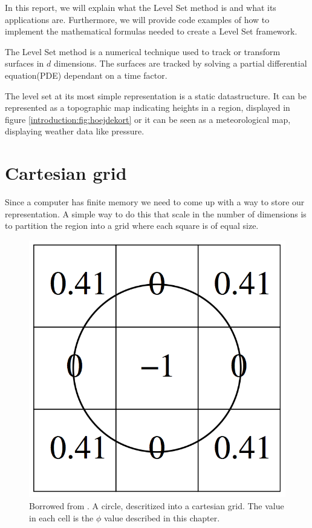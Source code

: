 In this report, we will explain what the Level Set method is and what
its applications are. Furthermore, we will provide code examples of
how to implement the mathematical formulas needed to create a Level
Set framework.

The Level Set method is a numerical technique used to track or
transform surfaces in $d$ dimensions. The surfaces are tracked by
solving a partial differential equation(PDE) dependant on a time factor.

The level set at its most simple representation is a static
datastructure. It can be represented as a topographic map indicating
heights in a region, displayed in figure
\vref{introduction:fig:hoejdekort} or it can be seen as a
meteorological map, displaying weather data like pressure.



\section*{Cartesian grid}

Since a computer has finite memory we need to come up with a way to
store our representation. A simple way to do this that scale in the
number of dimensions is to partition the region into a grid where each
square is of equal size.

\begin{figure}[htb] \centering
  \includegraphics[scale=0.3]{imgs/cartesiangrid.png}
  \caption{Borrowed from . A circle, descritized into a
cartesian grid. The value in each cell is the $\phi$ value described
in this chapter.}
  \label{introduction:fig:cartesiangrid}
\end{figure}

